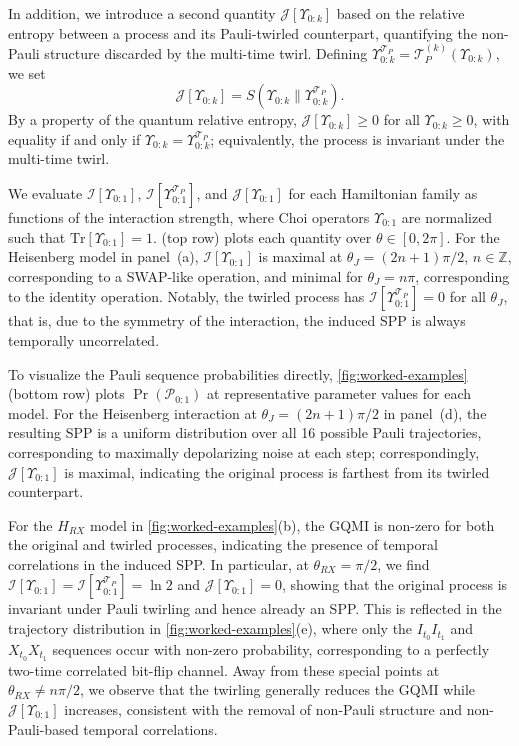 \documentclass[
    aps,
    prx,
    reprint,
    superscriptaddress,
    longbibliography,
    nofootinbib,
    floatfix,
]{revtex4-2}
\newcommand{\Tr}{\mathrm{Tr}}
\begin{document}
In addition, we introduce a second quantity \(\mathcal{J}[\Upsilon_{0:k}]\) based on the relative entropy between a process and its Pauli-twirled counterpart, quantifying the non-Pauli structure discarded by the multi-time twirl. Defining \(\Upsilon_{0:k}^{\mathcal{T}_P} = \mathcal{T}_P^{(k)}(\Upsilon_{0:k})\), we set
\begin{equation}
  \mathcal{J}[\Upsilon_{0:k}] = S(\Upsilon_{0:k} \| \Upsilon_{0:k}^{\mathcal{T}_P}).
\end{equation}
By a property of the quantum relative entropy, \(\mathcal{J}[\Upsilon_{0:k}] \geq 0\) for all \(\Upsilon_{0:k} \ge 0\), with equality if and only if \(\Upsilon_{0:k} = \Upsilon_{0:k}^{\mathcal{T}_P}\); equivalently, the process is invariant under the multi-time twirl.

We evaluate \(\mathcal{I}[\Upsilon_{0:1}]\), \(\mathcal{I}[\Upsilon_{0:1}^{\mathcal{T}_P}]\), and \(\mathcal{J}[\Upsilon_{0:1}]\) for each Hamiltonian family as functions of the interaction strength, where Choi operators \(\Upsilon_{0:1}\) are normalized such that \(\Tr[\Upsilon_{0:1}] = 1\).  (top row) plots each quantity over \(\theta \in [0,2\pi]\). For the Heisenberg model in panel~(a), \(\mathcal{I}[\Upsilon_{0:1}]\) is maximal at \(\theta_J = (2n+1)\pi/2\), \(n \in \mathbb{Z}\), corresponding to a SWAP-like operation, and minimal for \(\theta_J = n\pi\), corresponding to the identity operation. Notably, the twirled process has \(\mathcal{I}[\Upsilon_{0:1}^{\mathcal{T}_P}] = 0\) for all \(\theta_J\), that is, due to the symmetry of the interaction, the induced SPP is always temporally uncorrelated.

To visualize the Pauli sequence probabilities directly, \cref{fig:worked-examples} (bottom row) plots \(\Pr(\mathcal{P}_{0:1})\) at representative parameter values for each model. For the Heisenberg interaction at \(\theta_J = (2n + 1)\pi/2\) in panel~(d), the resulting SPP is a uniform distribution over all 16 possible Pauli trajectories, corresponding to maximally depolarizing noise at each step; correspondingly, \(\mathcal{J}[\Upsilon_{0:1}]\) is maximal, indicating the original process is farthest from its twirled counterpart.

For the \(H_{RX}\) model in \cref{fig:worked-examples}(b), the GQMI is non-zero for both the original and twirled processes, indicating the presence of temporal correlations in the induced SPP. In particular, at \(\theta_{RX} = \pi/2\), we find \(\mathcal{I}[\Upsilon_{0:1}] = \mathcal{I}[\Upsilon_{0:1}^{\mathcal{T}_P}] = \ln 2\) and \(\mathcal{J}[\Upsilon_{0:1}] = 0\), showing that the original process is invariant under Pauli twirling and hence already an SPP. This is reflected in the trajectory distribution in \cref{fig:worked-examples}(e), where only the \(I_{t_0}I_{t_1}\) and \(X_{t_0}X_{t_1}\) sequences occur with non-zero probability, corresponding to a perfectly two-time correlated bit-flip channel. Away from these special points at \(\theta_{RX} \neq n\pi/2\), we observe that the twirling generally reduces the GQMI while \(\mathcal{J}[\Upsilon_{0:1}]\) increases, consistent with the removal of non-Pauli structure and non-Pauli-based temporal correlations.
\end{document}

